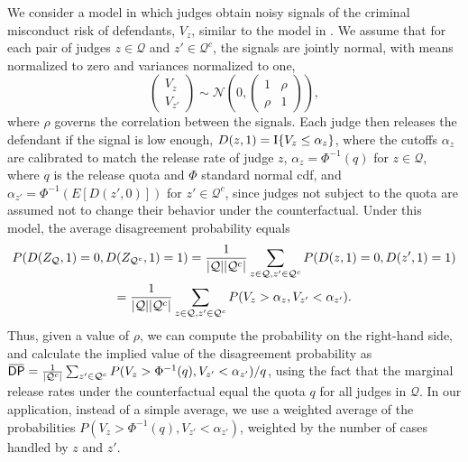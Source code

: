 \documentclass[12pt]{article}%
\theoremstyle{definition}
\DeclarePairedDelimiter\abs{\lvert}{\rvert}
\newcommand\1{\operatorname{I}\indicatorfence}
\newcommand{\overbar}[1]{\mkern 1.5mu\overline{\mkern-1.5mu#1\mkern-1.5mu}%
  \mkern 1.5mu}%
\newcommand{\DP}{\mathsf{DP}}
\begin{document}
\begin{appendices}
We consider a model in which judges obtain noisy signals of the criminal misconduct risk of defendants, $V_z$, similar to the model in \textcite[Section V]{cgy22}. We assume that for each pair of judges $z\in\mathcal{Q}$ and $z'\in\mathcal{Q}^c$,
the signals are jointly normal, with means normalized to zero and variances normalized to one,
\begin{equation*}
    \begin{pmatrix}
        V_z\\V_{z'}
    \end{pmatrix}\sim \mathcal{N}\left(0,\begin{pmatrix}
        1 & \rho\\ \rho & 1
    \end{pmatrix}\right),
\end{equation*}
where $\rho$ governs the correlation between the signals. Each judge then releases the defendant if the signal is low enough, $D(z,1)=\1{V_z\leq \alpha_z}$, where the cutoffs $\alpha_z$ are calibrated to match the release rate of judge $z$, $\alpha_z=\Phi^{-1}(q)$ for $z\in\mathcal{Q}$, where $q$ is the release quota and $\Phi$ standard normal cdf,
and $\alpha_{z'}=\Phi^{-1}(E[D(z',0)])$ for $z'\in\mathcal{Q}^c$, since judges not subject to the quota are assumed not to change their behavior under the counterfactual. Under this model, the average disagreement probability equals
\begin{multline*}
  P(D(Z_\mathcal{Q},1)=0, D(Z_{\mathcal{Q}^c},1)=1)
  = \frac{1}{\abs{\mathcal{Q}}\abs{\mathcal{Q}^c}}\sum_{z\in\mathcal{Q},
    z'\in\mathcal{Q}^c}
  P(D(z,1)=0, D(z',1)=1)\\
  = \frac{1}{\abs{\mathcal{Q}}\abs{\mathcal{Q}^c}}\sum_{z\in\mathcal{Q}, z'\in\mathcal{Q}^c}
  P(V_z>\alpha_z, V_{z'}<\alpha_{z'}).
\end{multline*}
Thus, given a value of $\rho$, we can compute the probability on the right-hand side, and calculate the implied value of the disagreement probability as $\overbar{\DP}=\frac{1}{\abs{\mathcal{Q}^c}}\sum_{z'\in\mathcal{Q}^c}
  P(V_z>\Phi^{-1}(q), V_{z'}<\alpha_{z'})/q$, using the fact that the marginal release rates under the counterfactual equal the quota $q$ for all judges in $\mathcal{Q}$. In our application, instead of a simple average, we use a weighted average of the probabilities $P(V_z>\Phi^{-1}(q), V_{z'}<\alpha_{z'})$, weighted by the number of cases handled by $z$ and $z'$.


\end{appendices}
\end{document}
